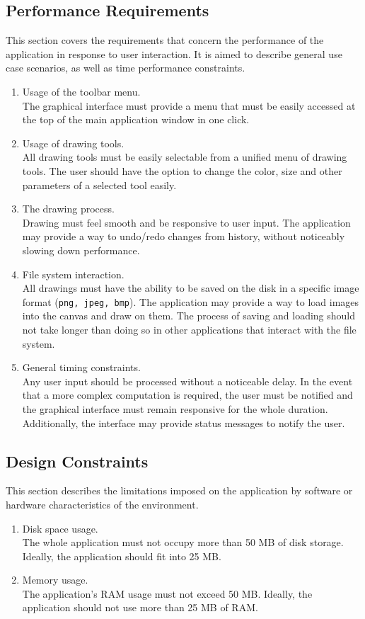 \documentclass{article}
\begin{document}
\subsection{Performance Requirements}
This section covers the requirements that concern the performance of the application in response to user interaction. It is aimed to describe general use case scenarios, as well as time performance constraints.
\begin{enumerate}
\item Usage of the toolbar menu.
\\
The graphical interface must provide a menu that must be easily accessed at the top of the main application window in one click.
\item Usage of drawing tools.
\\
All drawing tools must be easily selectable from a unified menu of drawing tools. The user should have the option to change the color, size and other parameters of a selected tool easily.
\item The drawing process.
\\
Drawing must feel smooth and be responsive to user input. The application may provide a way to undo/redo changes from history, without noticeably slowing down performance.
\item File system interaction.
\\
All drawings must have the ability to be saved on the disk in a specific image format (\texttt{png, jpeg, bmp}). The application may provide a way to load images into the canvas and draw on them. The process of saving and loading should not take longer than doing so in other applications that interact with the file system.
\item General timing constraints.
\\
Any user input should be processed without a noticeable delay. In the event that a more complex computation is required, the user must be notified and the graphical interface must remain responsive for the whole duration. Additionally, the interface may provide status messages to notify the user.
\end{enumerate}

\subsection{Design Constraints}
This section describes the limitations imposed on the application by software or hardware characteristics of the environment.
\begin{enumerate}
\item Disk space usage.
\\
The whole application must not occupy more than 50 MB of disk storage.
Ideally, the application should fit into 25 MB.
\item Memory usage.
\\
The application's RAM usage must not exceed 50 MB.
Ideally, the application should not use more than 25 MB of RAM.
\end{enumerate}
\end{document}
